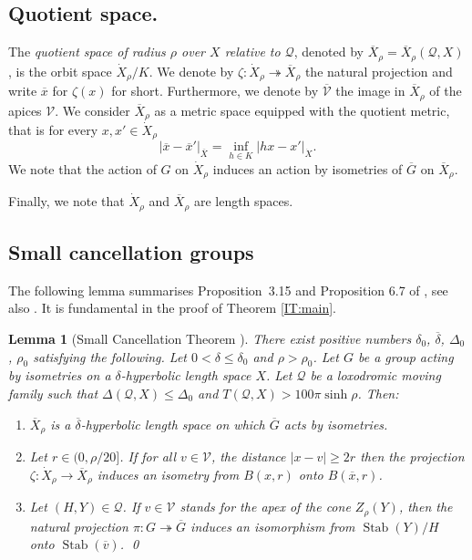 \documentclass[leqno,a4paper,10pt]{amsart}
\theoremstyle{plain}
\newtheorem{lem}[thm]{Lemma}
\theoremstyle{definition}
\theoremstyle{remark}
\newcommand{\cX}{\dot{X}}
\newcommand{\qX}{\overline{X}}
\newcommand{\q}[1]{\overline{#1}}
\newcommand{\stab}[1]{\operatorname{Stab}(#1)}
\renewcommand{\leq}{\leqslant}
\newcommand{\scrQ}{\mathscr{Q}}
\newcommand{\scrV}{\mathscr{V}}
\let\le\leqslant
\let\leq\leqslant
\newcommand{\onto}{\twoheadrightarrow}
\begin{document}
\subsection{Quotient space.}
The \emph{quotient space of radius $\rho$ over $X$ relative to $\scrQ$}, denoted by $\q{X}_{\rho}=\q{X}_{\rho}(\scrQ,X)$, is the orbit space $\dot{X}_{\rho}/K$. We denote by $\zeta\colon \cX_{\rho} \onto \q X_{\rho}$ the natural projection and write $\q x$ for $\zeta(x)$ for short. Furthermore, we denote by $\q \scrV$ the image in $\q X_{\rho}$ of the apices $\scrV$. We consider $\q X_{\rho}$ as a metric space equipped with the quotient metric, that is for every $x,x' \in \cX_{\rho}$ 
$$ |\q x- \q x'|_{\q X} = \inf_{h\in K} |hx-x'|_{\cX}.$$
We note that the action of $G$ on $\cX_{\rho}$ induces an action by isometries of $\q G$ on $\q X_{\rho}$. 

Finally, we note that $\dot{X}_{\rho}$ and $\overline X_{\rho}$ are length spaces.  



\subsection{Small cancellation groups}

The following lemma summarises Proposition~3.15 and Proposition 6.7 of \cite{coulon_geometry_2014}, see also  \cite[Proposition 5.4, Theorem 5.2]{coulon_partial_2016}.   %
It is fundamental in the proof of Theorem \ref{IT:main}.

\begin{lem}[Small Cancellation Theorem \cite{coulon_geometry_2014}]
	\label{lem:small-cancellation-theorem} 
 	There exist positive numbers $\delta_0$, $\q \delta$, $\Delta_0$, $\rho_0$ satisfying the following. Let $0<\delta\le \delta_0$ and $\rho>\rho_0$. Let $G$ be a group acting by isometries on a $\delta$-hyperbolic length  space $X$. Let $\scrQ$ be a loxodromic moving family such that  $\Delta(\scrQ,X) \leq \Delta_0$ and $T(\scrQ,X) > 100\pi \sinh\rho$. Then:
	\begin{enumerate}[label=(\roman*)]
		\item $\q X_{\rho}$ is a $\q \delta$-hyperbolic length space on which $\overline G$ acts by isometries.
		\item Let $r\in (0,\rho/20]$. If for all $v\in \scrV$, the distance $|x-v|\geqslant 2r$ then the projection $\zeta \colon \cX_{\rho} \to \qX_{\rho}$ induces an isometry from $B(x,r)$ onto $B(\q x,r)$.
		\item Let $(H,Y) \in \scrQ$. 
		If $v \in \scrV$ stands for the apex of the cone $Z_{\rho}(Y)$, then the natural projection $\pi \colon  G\onto \q G$ induces an isomorphism from $\stab Y/H$ onto $\stab{\q v}$.  \qed
	\end{enumerate}
\end{lem}
\end{document}
